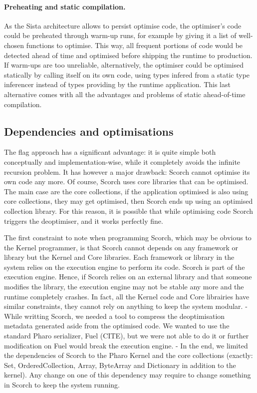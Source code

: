 \documentclass[a4paper,12pt,twoside]{../includes/ThesisStyle}
\begin{document}
\paragraph{Preheating and static compilation.} As the Sista architecture allows to persist optimise code, the optimiser's code could be preheated through warm-up runs, for example by giving it a list of well-chosen functions to optimise. This way, all frequent portions of code would be detected ahead of time and optimised before shipping the runtime to production. If warm-ups are too unreliable, alternatively, the optimiser could be optimised statically by calling itself on its own code, using types infered from a static type inferencer instead of types providing by the runtime application. This last alternative comes with all the advantages and problems of static ahead-of-time compilation.


\subsection{Dependencies and optimisations} 

The flag approach has a significant advantage: it is quite simple both conceptually and implementation-wise, while it completely avoids the infinite recursion problem. It has however a major drawback: Scorch cannot optimise its own code any more. Of course, Scorch uses core libraries that can be optimised. The main case are the core collections, if the application optimised is also using core collections, they may get optimised, then Scorch ends up using an optimised collection library. For this reason, it is possible that while optimising code Scorch triggers the deoptimiser, and it works perfectly fine.

The first constraint to note when programming Scorch, which may be obvious to the Kernel programmer, is that Scorch cannot depends on any framework or library but the Kernel and Core libraries. Each framework or library in the system relies on the execution engine to perform its code. Scorch is part of the execution engine. Hence, if Scorch relies on an external library and that someone modifies the library, the execution engine may not be stable any more and the runtime completely crashes. In fact, all the Kernel code and Core librairies have similar constraints, they cannot rely on anything to keep the system modular. 
-
While writting Scorch, we needed a tool to compress the deoptimisation metadata generated aside from the optimised code. We wanted to use the standard Pharo serializer, Fuel (CITE), but we were not able to do it or further modification on Fuel would break the execution engine.
-
In the end, we limited the dependencies of Scorch to the Pharo Kernel and the core collections (exactly: Set, OrderedCollection, Array, ByteArray and Dictionary in addition to the kernel). Any change on one of this dependency may require to change something in Scorch to keep the system running.
\end{document}

